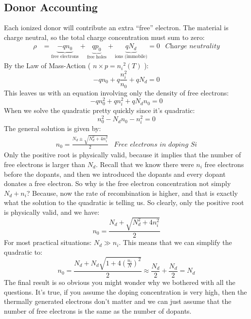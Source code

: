 \subsection{Donor Accounting}
Each ionized donor will contribute an extra “free” electron.  The material is charge neutral, so the total charge concentration must sum to zero:
    \begin{align}
        \rho &= \underbrace{- q{n_0}}_{\text{free electrons}}
        + \underbrace{q{p_0}}_{\text{free holes}}
        + \underbrace{q{N_d}}_{\text{ions (immobile)}} = 0 &\textit{Charge neutrality}
    \end{align}
By the Law of Mass-Action \big( $n \times p = {n_i}^2(T)$ \big):
    \begin{equation*}
        - q{n_0} + q\frac{{n_i^2}}{{{n_0}}} + q{N_d} = 0
    \end{equation*}
This leaves us with an equation involving only the density of free electrons:
    \begin{equation*}
        - qn_0^2 + qn_i^2 + q{N_d}{n_0} = 0
    \end{equation*}
When we solve the quadratic pretty quickly since it’s quadratic:
    \begin{equation*}
        n_0^2 - {N_d}{n_0} - n_i^2 = 0
    \end{equation*}
The general solution is given by:
    \begin{align}
        {n_0} = \frac{{{N_d} \pm \sqrt {N_d^2 + 4n_i^2} }}{2} &\textit{Free electrons in doping Si}
    \end{align}
Only the positive root is physically valid, because it implies that the number of free electrons is larger than $N_d$.  Recall that we know there were $n_i$ free electrons before the dopants, and then we introduced the dopants and every dopant donates a free electron.  So why is the free electron concentration not simply $N_d + n_i$?  Because, now the rate of recombination is higher, and that is exactly what the solution to the quadratic is telling us.  So clearly, only the positive root is physically valid, and we have:
    \begin{equation}
        {n_0} = \frac{{{N_d} + \sqrt {N_d^2 + 4n_i^2} }}{2}
    \end{equation}
For most practical situations:  ${N_d} \gg {n_i}$.  This means that we can simplify the quadratic to: 
    \begin{equation}
        {n_0} = \frac{{{N_d} + {N_d}\sqrt {1 + 4{{\left( {\frac{{{n_i}}}{N}} \right)}^2}} }}{2} \approx \frac{{{N_d}}}{2} + \frac{{{N_d}}}{2} = {N_d}
    \end{equation}
The final result is so obvious you might wonder why we bothered with all the questions.  It’s true, if you assume the doping concentration is very high, then the thermally generated electrons don’t matter and we can just assume that the number of free electrons is the same as the number of dopants.
\newpage
